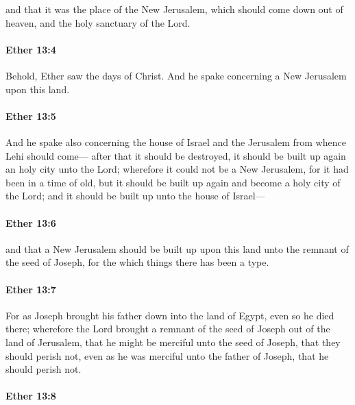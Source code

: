 			and that it was the place of the New Jerusalem,
			which should come down out of heaven,
			and the holy sanctuary of the Lord.

		\paragraph{Ether 13:4} %
			\label{ETHER-13-4}

			Behold, Ether saw the days of Christ.
			And he spake concerning a New Jerusalem upon this land.

		\paragraph{Ether 13:5} %
			\label{ETHER-13-5}

			And he spake also concerning the house of Israel
			and the Jerusalem from whence Lehi should come---
			after that it should be destroyed,
			it should be built up again an holy city unto the Lord;
			wherefore it could not be a New Jerusalem,
			for it had been in a time of old,
			but it should be built up again and become a holy city of the Lord;
			and it should be built up unto the house of Israel---

		\paragraph{Ether 13:6} %
			\label{ETHER-13-6}

			and that a New Jerusalem should be built up upon this land
			unto the remnant of the seed of Joseph,
			for the which things there has been a type.

		\paragraph{Ether 13:7} %
			\label{ETHER-13-7}

			For as Joseph brought his father down into the land of Egypt,
			even so he died there;
			wherefore the Lord brought a remnant of the seed of Joseph
			out of the land of Jerusalem,
			that he might be merciful unto the seed of Joseph,
			that they should perish not,
			even as he was merciful unto the father of Joseph,
			that he should perish not.

		\paragraph{Ether 13:8} %
			\label{ETHER-13-8}


